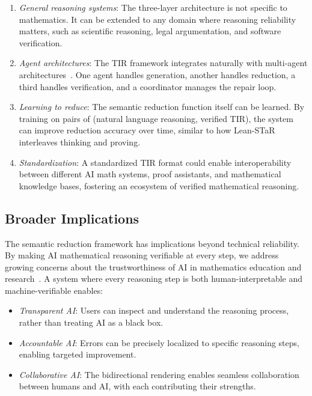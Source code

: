 \documentclass[11pt,a4paper]{article}
\begin{document}
\begin{enumerate}[leftmargin=*]
    \item \textit{General reasoning systems}: The three-layer architecture is not specific to mathematics. It can be extended to any domain where reasoning reliability matters, such as scientific reasoning, legal argumentation, and software verification.
    
    \item \textit{Agent architectures}: The TIR framework integrates naturally with multi-agent architectures~\cite{ma2025malot}. One agent handles generation, another handles reduction, a third handles verification, and a coordinator manages the repair loop.
    
    \item \textit{Learning to reduce}: The semantic reduction function itself can be learned. By training on pairs of (natural language reasoning, verified TIR), the system can improve reduction accuracy over time, similar to how Lean-STaR~\cite{leanstar2024} interleaves thinking and proving.
    
    \item \textit{Standardization}: A standardized TIR format could enable interoperability between different AI math systems, proof assistants, and mathematical knowledge bases, fostering an ecosystem of verified mathematical reasoning.
\end{enumerate}

\subsection{Broader Implications}

The semantic reduction framework has implications beyond technical reliability. By making AI mathematical reasoning verifiable at every step, we address growing concerns about the trustworthiness of AI in mathematics education and research~\cite{chen2026lectures}. A system where every reasoning step is both human-interpretable and machine-verifiable enables:
\begin{itemize}[leftmargin=*]
    \item \textit{Transparent AI}: Users can inspect and understand the reasoning process, rather than treating AI as a black box.
    \item \textit{Accountable AI}: Errors can be precisely localized to specific reasoning steps, enabling targeted improvement.
    \item \textit{Collaborative AI}: The bidirectional rendering enables seamless collaboration between humans and AI, with each contributing their strengths.
\end{itemize}
\end{document}
